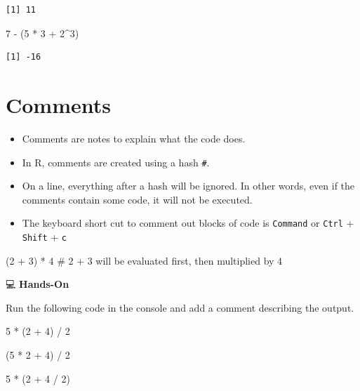 \documentclass[
  letterpaper,
  DIV=11,
  numbers=noendperiod]{scrreprt}
\newenvironment{Shaded}{\begin{snugshade}}{\end{snugshade}}
\newcommand{\CommentTok}[1]{\textcolor[rgb]{0.37,0.37,0.37}{#1}}
\newcommand{\DecValTok}[1]{\textcolor[rgb]{0.68,0.00,0.00}{#1}}
\newcommand{\NormalTok}[1]{\textcolor[rgb]{0.00,0.23,0.31}{#1}}
\newcommand{\SpecialCharTok}[1]{\textcolor[rgb]{0.37,0.37,0.37}{#1}}
\begin{document}
\begin{tcolorbox}
\begin{verbatim}
[1] 11
\end{verbatim}

\begin{Shaded}
\begin{Highlighting}[]
\DecValTok{7} \SpecialCharTok{{-}}\NormalTok{ (}\DecValTok{5} \SpecialCharTok{*} \DecValTok{3} \SpecialCharTok{+} \DecValTok{2}\SpecialCharTok{\^{}}\DecValTok{3}\NormalTok{)}
\end{Highlighting}
\end{Shaded}

\begin{verbatim}
[1] -16
\end{verbatim}

\end{tcolorbox}

\section{Comments}\label{comments}

\begin{itemize}
\item
  Comments are notes to explain what the code does.
\item
  In R, comments are created using a hash \texttt{\#}.
\item
  On a line, everything after a hash will be ignored. In other words,
  even if the comments contain some code, it will not be executed.
\item
  The keyboard short cut to comment out blocks of code is
  \texttt{Command} or \texttt{Ctrl} + \texttt{Shift} + \texttt{c}
\end{itemize}

\begin{Shaded}
\begin{Highlighting}[]
\NormalTok{(}\DecValTok{2} \SpecialCharTok{+} \DecValTok{3}\NormalTok{) }\SpecialCharTok{*} \DecValTok{4}    \CommentTok{\# 2 + 3 will be evaluated first, then multiplied by 4}
\end{Highlighting}
\end{Shaded}

💻 \textbf{Hands-On}

Run the following code in the console and add a comment describing the
output.

\begin{Shaded}
\begin{Highlighting}[]
\DecValTok{5} \SpecialCharTok{*}\NormalTok{ (}\DecValTok{2} \SpecialCharTok{+} \DecValTok{4}\NormalTok{) }\SpecialCharTok{/} \DecValTok{2} 

\NormalTok{(}\DecValTok{5} \SpecialCharTok{*} \DecValTok{2} \SpecialCharTok{+} \DecValTok{4}\NormalTok{) }\SpecialCharTok{/} \DecValTok{2}

\DecValTok{5} \SpecialCharTok{*}\NormalTok{ (}\DecValTok{2} \SpecialCharTok{+} \DecValTok{4} \SpecialCharTok{/} \DecValTok{2}\NormalTok{)}
\end{Highlighting}
\end{Shaded}
\end{document}
